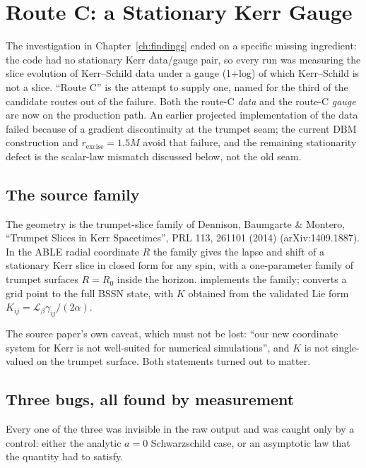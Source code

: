 \documentclass[11pt,openany]{book}
\begin{document}
\chapter{Route C: a Stationary Kerr Gauge}
\label{ch:routec}

The investigation in Chapter~\ref{ch:findings} ended on a specific missing
ingredient: the code had no stationary Kerr data/gauge pair, so every run was
measuring the slice evolution of Kerr--Schild data under a gauge (1+log) of
which Kerr--Schild is not a slice. ``Route C'' is the attempt to supply one,
named for the third of the candidate routes out of the failure. Both the
route-C \emph{data} and the route-C \emph{gauge} are now on the production
path. An earlier projected implementation of the data failed because of a
gradient discontinuity at the trumpet seam; the current DBM construction and
$r_{\mathrm{excise}} = 1.5M$ avoid that failure, and the remaining stationarity
defect is the scalar-law mismatch discussed below, not the old seam.

\section{The source family}

The geometry is the trumpet-slice family of Dennison, Baumgarte \& Montero,
``Trumpet Slices in Kerr Spacetimes'', PRL 113, 261101 (2014)
(arXiv:1409.1887). In the ABLE radial coordinate $R$ the family gives the
lapse and shift of a stationary Kerr slice in closed form for any spin, with
a one-parameter family of trumpet surfaces $R = R_0$ inside the horizon.
 implements the family;
 converts a grid point to the full
BSSN state, with $K$ obtained from the validated Lie form
$K_{ij} = \mathcal{L}_\beta\gamma_{ij}/(2\alpha)$.

The source paper's own caveat, which must not be lost: ``our new coordinate
system for Kerr is not well-suited for numerical simulations'', and $K$ is
not single-valued on the trumpet surface. Both statements turned out to
matter.

\section{Three bugs, all found by measurement}

Every one of the three was invisible in the raw output and was caught only by
a control: either the analytic $a = 0$ Schwarzschild case, or an asymptotic
law that the quantity had to satisfy.
\end{document}
